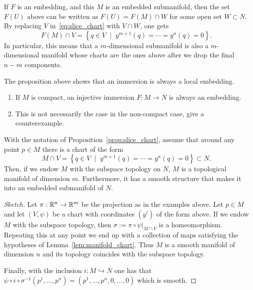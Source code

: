 If $F$ is an embedding, and this $M$ is an embedded submanifold, then the set $F(U)$ above can be written as $F(U) = F(M)\cap W$ for some open set $W\subset N$.
By replacing $V$ in~\eqref{eq:slice_chart} with $V\cap W$, one gets 
\begin{equation}
  F(M)\cap V = \left\{ q \in V \;\mid\; y^{m+1}(q)=\cdots=y^n(q)=0\right\}.
\end{equation}
In particular, this means that a $m$-dimensional submanifold is also a $m$-dimensional manifold whose charts are the ones above after we drop the final $n-m$ components.

The proposition above shows that an immersion is always a local embedding.
\begin{exercise}
  \begin{enumerate}
    \item If $M$ is compact, an injective immersion $F:M\to N$ is always an embedding.
    \item This is not necessarily the case in the non-compact case, give a counterexample.
  \end{enumerate}
\end{exercise}

\begin{lemma}
  With the notation of Proposition~\ref{prop:slice_chart}, assume that around any point $p\in M$ there is a chart of the form
  \begin{equation}
    M\cap V = \left\{ q \in V \;\mid\; y^{m+1}(q)=\cdots=y^n(q)=0\right\} \subset N.
  \end{equation}
  Then, if we endow $M$ with the subspace topology on $N$, $M$ is a topological manifold of dimension $m$.
  Furthermore, it has a smooth structure that makes it into an embedded submanifold of $N$.
\end{lemma}
\begin{proof}[Sketch]
  Let $\pi: \mathbb{R}^n\to\mathbb{R}^m$ be the projection as in the examples above.
  Let $p\in M$ and let $(V,\psi)$ be a chart with coordinates $(y^i)$ of the form above.
  If we endow $M$ with the subspace topology, then $\sigma:= \pi \circ \psi\big|_{M\cap V}$ is a homeomorphism.
  Repeating this at any point we end up with a collection of maps satisfying the hypotheses of Lemma~\ref{lem:manifold_chart}.
  Thus $M$ is a smooth manifold of dimension $n$ and its topology coincides with the subspace topology.

  Finally, with the inclusion $i:M\hookrightarrow N$ one has that $\psi \circ i\circ \sigma^{-1} (p^1,\ldots,p^n) = (p^1,\ldots,p^n,0,\ldots,0)$ which is smooth.
\end{proof}

